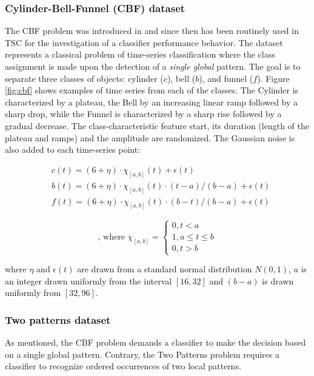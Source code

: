 \subsubsection{Cylinder-Bell-Funnel (CBF) dataset}
The CBF problem was introduced in \cite{cbf} and since then has been routinely used in TSC for the investigation 
of a classifier performance behavior.
The dataset represents a classical problem of time-series classification where the class assignment is made upon the 
detection of a \textit{single global} pattern. 
The goal is to separate three classes of objects: cylinder ($c$), bell ($b$), and funnel ($f$).  Figure \ref{fig:cbf} 
shows examples of time series from each of the classes. 
The Cylinder is characterized by a plateau, the Bell by an increasing linear ramp followed by a sharp drop, 
while the Funnel is characterized by a sharp rise followed by a gradual decrease. 
The class-characteristic feature start, its duration (length of the plateau and ramps) and the amplitude are randomized. 
The Gaussian noise is also added to each time-series point:

\noindent\begin{minipage}{.5\linewidth}
\begin{equation*}
\begin{split}
 &c(t)=(6+\eta)\cdot\chi_{[a,b]}(t)+\epsilon(t) \\
 & b(t)=(6+\eta)\cdot\chi_{[a,b]}(t)\cdot(t-a)/(b-a)+\epsilon(t) \\
 & f(t)=(6+\eta)\cdot\chi_{[a,b]}(t)\cdot(b-t)/(b-a)+\epsilon(t)
\end{split}
\end{equation*}
\end{minipage}%
\begin{minipage}{.5\linewidth}
\begin{equation}
\label{eq:cbf}
\text{, where }
\chi_{[a,b]}=\begin{cases}
0,t < a \\
1,a\leq t\leq b\\
0,t > b \end{cases}
\end{equation}
\end{minipage}
\vspace{0.5cm}

where $\eta$ and $\epsilon(t)$ are drawn from a standard normal distribution $N(0,1)$, $a$ is an integer 
drawn uniformly from the interval $[16,32]$ and $(b-a)$ is drawn uniformly from $[32,96]$.

\subsubsection{Two patterns dataset}
As mentioned, the CBF problem demands a classifier to make the decision based on a single global pattern. 
Contrary, the Two Patterns problem requires a classifier to recognize ordered occurrences of two local patterns.

